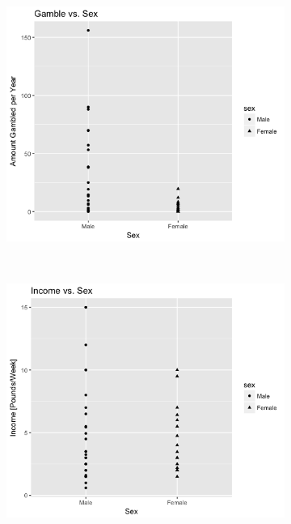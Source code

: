 \documentclass{exam}
\begin{document}
\begin{figure}[t!]
	\centering
	\begin{subfigure}
	\centering
	\includegraphics[scale = .7]{Gamble_v_sex}		
	\end{subfigure}%
	~ 
	\begin{subfigure}
	\centering
	\includegraphics[scale=0.7]{Income_V_sex}
	\end{subfigure}
\end{figure}
\end{document}
